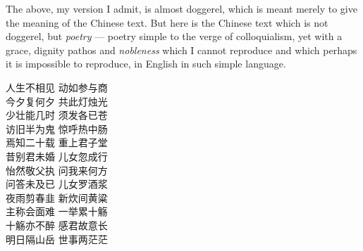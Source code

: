 The above, my version I admit, is almost doggerel, which is meant merely to give the meaning of the Chinese text.
But here is the Chinese text which is not doggerel, but \emph{poetry} --- poetry simple to the verge of colloquialism, yet with a grace, dignity pathos and \emph{nobleness} which I cannot reproduce and which perhaps it is impossible to reproduce, in English in such simple language.
\begin{center}
    人生不相见 \qquad 动如参与商  \\
    今夕复何夕 \qquad 共此灯烛光 \\
    少壮能几时 \qquad 须发各已苍 \\
    访旧半为鬼 \qquad 惊呼热中肠 \\
    焉知二十载 \qquad 重上君子堂 \\
    昔别君未婚 \qquad 儿女忽成行 \\
    怡然敬父执 \qquad 问我来何方 \\
    问答未及已 \qquad 儿女罗酒浆 \\
    夜雨剪春韭 \qquad 新炊间黄粱 \\
    主称会面难 \qquad 一举累十觞 \\
    十觞亦不醉 \qquad 感君故意长 \\
    明日隔山岳 \qquad 世事两茫茫 \\
\end{center}

